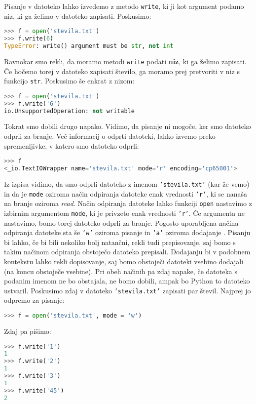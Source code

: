 Pisanje v datoteko lahko izvedemo z metodo \texttt{write}, ki ji kot argument podamo niz, ki ga želimo v datoteko zapisati. Poskusimo:
\begin{lstlisting}[language=Python, showstringspaces=false]
>>> f = open('stevila.txt')
>>> f.write(6)
TypeError: write() argument must be str, not int
\end{lstlisting}
Ravnokar smo rekli, da moramo metodi \texttt{write} podati \textbf{niz}, ki ga želimo zapisati. Če hočemo torej v datoteko zapisati število, ga moramo prej pretvoriti v niz s funkcijo \texttt{str}. Poskusimo še enkrat z nizom: 
\begin{lstlisting}[language=Python, showstringspaces=false]
>>> f = open('stevila.txt')
>>> f.write('6')
io.UnsupportedOperation: not writable
\end{lstlisting}
Tokrat smo dobili drugo napako. Vidimo, da pisanje ni mogoče, ker smo datoteko odprli za branje. Več informacij o odprti datoteki, lahko izvemo preko spremenljivke, v katero smo datoteko odprli:
\begin{lstlisting}[language=Python, showstringspaces=false]
>>> f
<_io.TextIOWrapper name='stevila.txt' mode='r' encoding='cp65001'>
\end{lstlisting}
Iz izpisa vidimo, da smo odprli datoteko z imenom \texttt{'stevila.txt'} (kar že vemo) in da je \texttt{mode} oziroma način odpiranja datoteke enak vrednosti \texttt{'r'}, ki se nanaša na branje oziroma \emph{read}. Način odpiranja datoteke lahko funkciji \texttt{open} nastavimo z izbirnim argumentom \texttt{mode}, ki je privzeto enak vrednosti \texttt{'r'}. Če argumenta ne nastavimo, bomo torej datoteko odprli za branje. Pogosto uporabljena načina odpiranja datoteke sta še \texttt{'w'} oziroma pisanje  in \texttt{'a'} oziroma dodajanje . Pisanju bi lahko, če bi bili nekoliko bolj natančni, rekli tudi prepisovanje, saj bomo s takim načinom odpiranja obstoječo datoteko prepisali. Dodajanju bi v podobnem kontekstu lahko rekli dopisovanje, saj bomo obstoječi datoteki vsebino dodajali (na koncu obstoječe vsebine). Pri obeh načinih pa zdaj napake, če datoteka s podanim imenom ne bo obstajala, ne bomo dobili, ampak bo Python to datoteko ustvaril. Poskusimo zdaj v datoteko \texttt{'stevila.txt'} zapisati par števil. Najprej jo odpremo za pisanje:
\begin{lstlisting}[language=Python, showstringspaces=false]
>>> f = open('stevila.txt', mode = 'w')
\end{lstlisting}
Zdaj pa pišimo:
\begin{lstlisting}[language=Python, showstringspaces=false]
>>> f.write('1')
1
>>> f.write('2')
1
>>> f.write('3')
1
>>> f.write('45')
2
\end{lstlisting}

